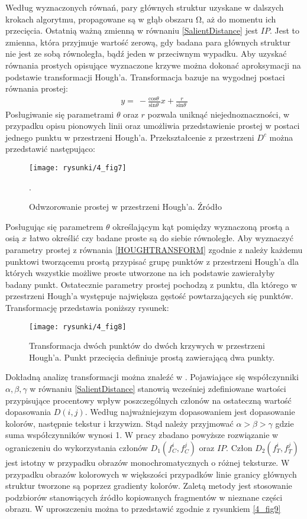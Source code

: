 \documentclass[12pt, twoside, openany]{report}
\theoremstyle{definition}
\begin{document}
Według wyznaczonych równań, pary głównych struktur uzyskane w dalszych krokach algorytmu, propagowane są w głąb obszaru $\mathrm{\Omega }$, aż do momentu ich przecięcia. Ostatnią ważną zmienną w równaniu \eqref{SalientDistance} jest $IP$. Jest to zmienna, która przyjmuje wartość zerową, gdy badana para głównych struktur nie jest ze sobą równoległa, bądź jeden w przeciwnym wypadku. Aby uzyskać równania prostych opisujące wyznaczone krzywe można dokonać aproksymacji na podstawie transformacji Hough'a. Transformacja bazuje na wygodnej postaci równania prostej:
\begin{align}
y=\ -\frac{{\mathrm{cos} \theta \ }}{{\mathrm{sin} \theta \ }}x+\frac{r}{{\mathrm{sin} \theta \ }}
\label{HOUGHTRANSFORM}
\end{align}
Posługiwanie się parametrami $\theta $ oraz $r$ pozwala uniknąć niejednoznaczności, w przypadku opisu pionowych linii oraz umożliwia przedstawienie prostej w postaci jednego punktu w przestrzeni Hough'a. Przekształcenie z przestrzeni $D^c$ można przedstawić następująco:
\begin{figure}[!h]
	\centering
	\texttt{[image: rysunki/4\_fig7]}
	\caption{Odwzorowanie prostej w przestrzeni Hough’a. Źródło \cite{houghTransform}}.
\label{4_fig7}
\end{figure}
Posługując się parametrem $\theta$ określającym kąt pomiędzy wyznaczoną prostą a osią $x$ łatwo określić czy badane proste są do siebie równoległe. Aby wyznaczyć parametry prostej z równania \eqref{HOUGHTRANSFORM} zgodnie z \cite{houghTransform} należy każdemu punktowi tworzącemu prostą przypisać grupę punktów z przestrzeni Hough'a dla których wszystkie możliwe proste utworzone na ich podstawie zawierałyby badany punkt. Ostatecznie parametry prostej pochodzą z punktu, dla którego w przestrzeni Hough'a występuje największa gęstość powtarzających się punktów. Transformację przedstawia poniższy rysunek:
\begin{figure}[!h]
	\centering
	\texttt{[image: rysunki/4\_fig8]}
	\caption{Transformacja dwóch punktów do dwóch krzywych w przestrzeni Hough'a. Punkt przecięcia definiuje prostą zawierającą dwa punkty.}
\label{4_fig8}
\end{figure}
Dokładną analizę transformacji można znaleźć w \cite{houghTransform}.
Pojawiające się współczynniki $\alpha ,\beta ,\gamma $ w równaniu \eqref{SalientDistance} stanowią wcześniej zdefiniowane wartości przypisujące procentowy wpływ poszczególnych członów na ostateczną wartość dopasowania $D(i,j)$. Według \cite{SalientStrucTexProp} najważniejszym dopasowaniem jest dopasowanie kolorów, następnie tekstur i krzywizn. Stąd należy przyjmować $\alpha >\beta >\gamma $ gdzie suma współczynników wynosi 1. W pracy zbadano powyższe rozwiązanie w ograniczeniu do wykorzystania członów $D_1\left(f^i_C,f^j_C\right)$ oraz $IP$. Człon $D_2\left(f^i_T,f^j_T\right)$ jest istotny w przypadku obrazów monochromatycznych o różnej teksturze. W przypadku obrazów kolorowych w większości przypadków linie granicy głównych struktur tworzone są poprzez gradienty kolorów. Zaletą metody jest stosowanie podzbiorów stanowiących źródło kopiowanych fragmentów w nieznane części obrazu. W uproszczeniu można to przedstawić zgodnie z rysunkiem \autoref{4_fig9}
\end{document}
